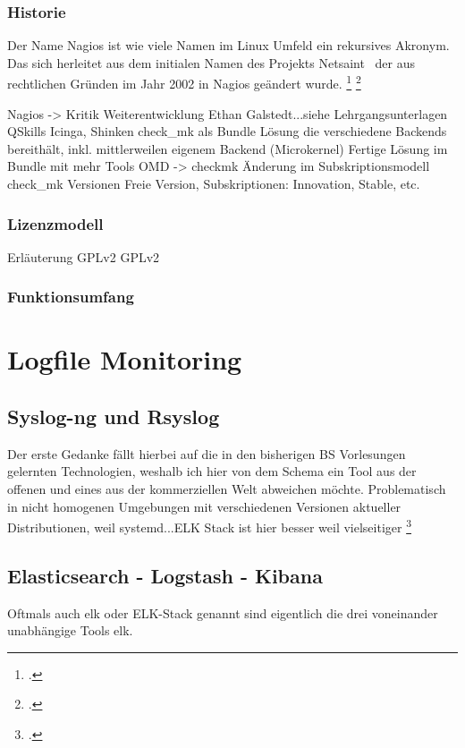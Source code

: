 \documentclass[12pt,a4paper,parskip]{scrreprt}
\begin{document}
	\subsubsection{Historie}
	Der Name Nagios ist wie viele Namen im Linux Umfeld ein rekursives Akronym. Das sich herleitet aus dem initialen Namen des Projekts \glqq Netsaint \grqq\ der aus rechtlichen Gründen im Jahr 2002 in Nagios geändert wurde. 
	\footcite{nagioshistory} \footcite{nagiosnamefaq}
	
	Nagios -> Kritik Weiterentwicklung Ethan Galstedt...siehe Lehrgangsunterlagen QSkills
	Icinga, Shinken
	check\_mk als Bundle Lösung die verschiedene Backends bereithält, inkl. mittlerweilen eigenem Backend (Microkernel)
	Fertige Lösung im Bundle mit mehr Tools
	OMD -> checkmk Änderung im Subskriptionsmodell
	check\_mk Versionen Freie Version, Subskriptionen: Innovation, Stable, etc.
	
	\subsubsection{Lizenzmodell}
	Erläuterung GPLv2
	\gls{GPLv2}
	\subsubsection{Funktionsumfang}
	\section{Logfile Monitoring}
	\subsection{Syslog-ng und Rsyslog}
	Der erste Gedanke fällt hierbei auf die in den bisherigen BS Vorlesungen gelernten Technologien, weshalb ich hier von dem Schema ein Tool aus der offenen und eines aus der kommerziellen Welt abweichen möchte.
	Problematisch in nicht homogenen Umgebungen mit verschiedenen Versionen aktueller Distributionen, weil systemd...ELK Stack ist hier besser weil vielseitiger
	\footcite{systemd2015}
	\subsection{Elasticsearch - Logstash - Kibana}
	Oftmals auch \acrshort{elk} oder ELK-Stack genannt sind eigentlich die drei voneinander unabhängige Tools \acrlong{elk}. 
\end{document}
